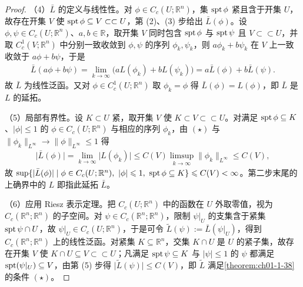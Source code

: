 \documentclass[../../main.tex]{subfiles}%
\begin{document}
\begin{proof}
（4）$\bar L$ 的定义与线性性。对 $\phi\in C_c(U;\mathbb{R}^n)$，集 $\operatorname{spt}\phi$ 紧且含于开集 $U$，故存在开集 $V$ 使 $\operatorname{spt}\phi\subseteq V\subset\subset U$，第 (2)、(3) 步给出 $\bar L(\phi)$。设 $\phi,\psi\in C_c(U;\mathbb{R}^n)$、$a,b\in\mathbb{R}$，取开集 $V$ 同时包含 $\operatorname{spt}\phi$ 与 $\operatorname{spt}\psi$ 且 $V\subset\subset U$，并取 $C_c^1(V;\mathbb{R}^n)$ 中分别一致收敛到 $\phi,\psi$ 的序列 $\phi_k,\psi_k$，则 $a\phi_k+b\psi_k$ 在 $V$ 上一致收敛于 $a\phi+b\psi$，于是
\begin{align*}
\bar L(a\phi+b\psi)=\lim_{k\to\infty}\bigl(aL(\phi_k)+bL(\psi_k)\bigr)=a\bar L(\phi)+b\bar L(\psi).
\end{align*}
故 $\bar L$ 为线性泛函。又对 $\phi\in C_c^1(U;\mathbb{R}^n)$ 取 $\phi_k=\phi$ 得 $\bar L(\phi)=L(\phi)$，即 $\bar L$ 是 $L$ 的延拓。

（5）局部有界性。设 $K\subset U$ 紧，取开集 $V$ 使 $K\subset V\subset\subset U$。对满足 $\operatorname{spt}\phi\subseteq K$、$\lvert\phi\rvert\leqslant1$ 的 $\phi\in C_c(U;\mathbb{R}^n)$ 与相应的序列 $\phi_k$，由 $(\star)$ 与 $\lVert\phi_k\rVert_{L^{\infty}}\to\lVert\phi\rVert_{L^{\infty}}\leqslant1$ 得
\begin{align*}
\lvert\bar L(\phi)\rvert=\lim_{k\to\infty}\lvert L(\phi_k)\rvert\leqslant C(V)\limsup_{k\to\infty}\lVert\phi_k\rVert_{L^{\infty}}\leqslant C(V),
\end{align*}
故 $\sup\{\lvert\bar L(\phi)\rvert\mid\phi\in C_c(U;\mathbb{R}^n),\ \lvert\phi\rvert\leqslant1,\ \operatorname{spt}\phi\subseteq K\}\leqslant C(V)<\infty$。第二步末尾的上确界中的 $L$ 即指此延拓 $\bar L$。

（6）应用 Riesz 表示定理。把 $C_c(U;\mathbb{R}^n)$ 中的函数在 $U$ 外取零值，视为 $C_c(\mathbb{R}^n;\mathbb{R}^n)$ 的子空间。对 $\psi\in C_c(\mathbb{R}^n;\mathbb{R}^n)$，限制 $\psi|_U$ 的支集含于紧集 $\operatorname{spt}\psi\cap U$，故 $\psi|_U\in C_c(U;\mathbb{R}^n)$，于是可令 $\tilde L(\psi):=\bar L(\psi|_U)$，得到 $C_c(\mathbb{R}^n;\mathbb{R}^n)$ 上的线性泛函。对紧集 $K\subseteq\mathbb{R}^n$，交集 $K\cap U$ 是 $U$ 的紧子集，故存在开集 $V$ 使 $K\cap U\subseteq V\subset\subset U$；凡满足 $\operatorname{spt}\psi\subseteq K$ 与 $\lvert\psi\rvert\leqslant1$ 的 $\psi$ 都满足 $\operatorname{spt}(\psi|_U)\subseteq V$，由第 (5) 步得 $\lvert\tilde L(\psi)\rvert\leqslant C(V)$，即 $\tilde L$ 满足\cref{theorem:ch01-1-38}的条件 $(\star)$。%


\end{proof}
\end{document}
